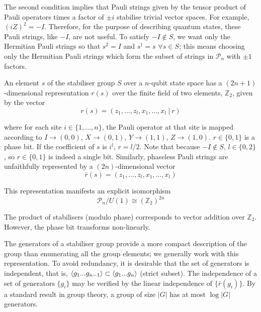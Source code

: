 \documentclass[10pt]{article}
\begin{document}
The second condition implies that Pauli strings given by the tensor product of Pauli operators times a factor of $\pm i$ stabilise trivial vector spaces. For example, $(iZ)^2 = -I$. Therefore, for the purpose of describing quantum states, these Pauli strings, like $-I$, are not useful. To satisfy $-I \notin S$, we want only the Hermitian Pauli strings so that $s^2=I$ and $s^\dagger=s$ $\forall s \in S$; this means choosing only the Hermitian Pauli strings which form the subset of strings in $\mathcal{P}_n$ with $\pm1$ factors.

An element $s$ of the stabiliser group $S$ over a $n$-qubit state space has a $(2n+1)$-dimensional representation $r(s)$ over the finite field of two elements, $\mathbb{Z}_2$, given by the vector
\begin{equation}
r(s) = (z_1, ..., z_l, x_1, ..., x_l \ | \ r)
\end{equation}

where for each site $i \in \{1,...,n\}$, the Pauli operator at that site is mapped according to $I \rightarrow (0,0)$, $X\rightarrow (0,1)$, $Y \rightarrow (1,1)$, $Z \rightarrow (1,0)$. $r \in \{0,1\}$ is a phase bit. If the coefficient of $s$ is $i^l$, $r=l/2$. Note that because $-I \notin S$, $l\in\{0,2\}$, so $r\in\{0,1\}$ is indeed a single bit. Similarly, phaseless Pauli strings are unfaithfully represented by a $(2n)$-dimensional vector
\begin{equation}
\bar{r}(s) = (z_1, ..., z_l, x_1, ..., x_l )
\end{equation}

This representation manifests an explicit isomorphism
\begin{equation}
\mathcal{P}_n / U(1) \cong (\mathbb{Z}_2)^{2n}
\end{equation}

The product of stabilisers (modulo phase) corresponds to vector addition over $\mathbb{Z}_2$. However, the phase bit transforms non-linearly.

The generators of a stabiliser group provide a more compact description of the group than enumerating all the group elements; we generally work with this representation. To avoid redundancy, it is desirable that the set of generators is independent, that is, $\ev{g_1...g_{n-1}} \subset \ev{g_1...g_n}$ (strict subset). The independence of a set of generators $\{g_i\}$ may be verified by the linear independence of $\{\bar{r}(g_i)\}$. By a standard result in group theory, a group of size $|G|$ has at most $\log|G|$ generators. 
\end{document}
